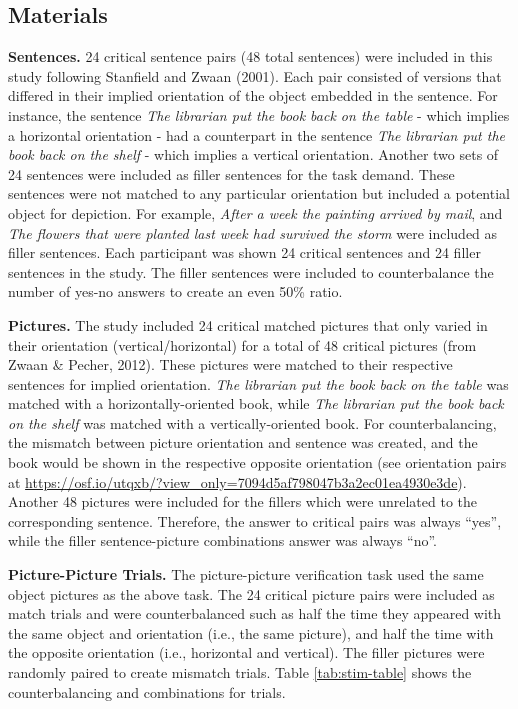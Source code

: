 \documentclass[
  man,mask,floatsintext]{apa7}
\begin{document}
\hypertarget{materials}{%
\subsection{Materials}\label{materials}}

\textbf{Sentences.} 24 critical sentence pairs (48 total sentences) were
included in this study following Stanfield and Zwaan (2001). Each pair
consisted of versions that differed in their implied orientation of the
object embedded in the sentence. For instance, the sentence \emph{The
librarian put the book back on the table} - which implies a horizontal
orientation - had a counterpart in the sentence \emph{The librarian put the
book back on the shelf} - which implies a vertical orientation. Another
two sets of 24 sentences were included as filler sentences for the task
demand. These sentences were not matched to any particular orientation
but included a potential object for depiction. For example, \emph{After a
week the painting arrived by mail}, and \emph{The flowers that were planted
last week had survived the storm} were included as filler sentences.
Each participant was shown 24 critical sentences and 24 filler sentences
in the study. The filler sentences were included to counterbalance the
number of yes-no answers to create an even 50\% ratio.

\textbf{Pictures.} The study included 24 critical matched pictures that only
varied in their orientation (vertical/horizontal) for a total of 48
critical pictures (from Zwaan \& Pecher, 2012). These
pictures were matched to their respective sentences for implied
orientation. \emph{The librarian put the book back on the table} was matched
with a horizontally-oriented book, while \emph{The librarian put the book
back on the shelf} was matched with a vertically-oriented book. For
counterbalancing, the mismatch between picture orientation and sentence
was created, and the book would be shown in the respective opposite
orientation (see orientation pairs at \url{https://osf.io/utqxb/?view_only=7094d5af798047b3a2ec01ea4930e3de}). Another
48 pictures were included for the fillers which were unrelated to the
corresponding sentence. Therefore, the answer to critical pairs was
always ``yes'', while the filler sentence-picture combinations answer was
always ``no''.

\textbf{Picture-Picture Trials.} The picture-picture verification task used
the same object pictures as the above task. The 24 critical picture
pairs were included as match trials and were counterbalanced such as
half the time they appeared with the same object and orientation (i.e.,
the same picture), and half the time with the opposite orientation
(i.e., horizontal and vertical). The filler pictures were randomly
paired to create mismatch trials. Table \ref{tab:stim-table} shows the
counterbalancing and combinations for trials.
\end{document}
